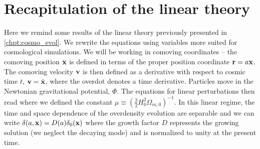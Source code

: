 \section{Recapitulation of the linear theory}
Here we remind some results of the linear theory previously presented in \autoref{chpt:cosmo_evol}. We rewrite the equations using variables more suited for cosmological simulations. We will be working in comoving coordinates -- the comoving position $\mathbf x$ is defined in terms of the proper position coordinate $\mathbf r = a\mathbf x$. The comoving velocity $\mathbf v$ is then defined as a derivative with respect to cosmic time $t$, $\mathbf v = \dot{\mathbf x}$, where the overdot denotes a time derivative. Particles move in the Newtonian gravitational potential, $\Phi$. The equations for linear perturbations then read
where we defined the constant $\mu\equiv\left(\frac32 H_0^2\Omega_{m, 0}\right)^{-1}$. In this linear regime, the time and space dependence of the overdensity evolution are separable and we can write $\delta(a, \mathbf x)=D(a)\delta_0(\mathbf x)$ where the growth factor $D$ represents the growing solution (we neglect the decaying mode) and is normalized to unity at the present time.

